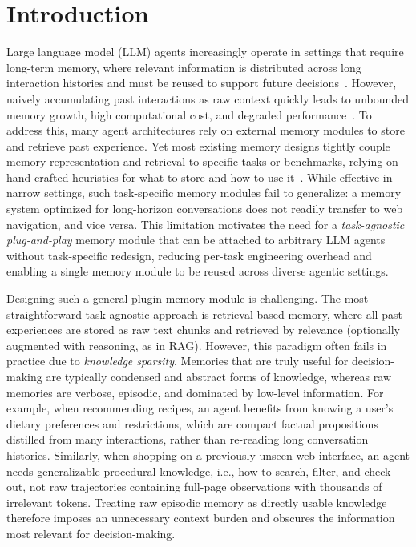 
\section{Introduction}


Large language model (LLM) agents increasingly operate in settings that require long-term memory, where relevant information is distributed across long interaction histories and must be reused to support future decisions~\citep{Wang_2024,park2023generativeagentsinteractivesimulacra}. However, naively accumulating past interactions as raw context quickly leads to unbounded memory growth, high computational cost, and degraded performance~\citep{packer2024memgptllmsoperatingsystems,liu2023lostmiddlelanguagemodels}. To address this, many agent architectures rely on external memory modules to store and retrieve past experience.
Yet most existing memory designs tightly couple memory representation and retrieval to specific tasks or benchmarks, relying on hand-crafted heuristics for what to store and how to use it~\citep{wang2024agentworkflowmemory,gutiérrez2025ragmemorynonparametriccontinual}. While effective in narrow settings, such task-specific memory modules fail to generalize: a memory system optimized for long-horizon conversations does not readily transfer to web navigation, and vice versa. This limitation motivates the need for a \textit{task-agnostic plug-and-play} memory module that can be attached to arbitrary LLM agents without task-specific redesign, reducing per-task engineering overhead and enabling a single memory module to be reused across diverse agentic settings.


Designing such a general plugin memory module is challenging. The most straightforward task-agnostic approach is retrieval-based memory, where all past experiences are stored as raw text chunks and retrieved by relevance (optionally augmented with reasoning, as in RAG). However, this paradigm often fails in practice due to \textit{knowledge sparsity}. Memories that are truly useful for decision-making are typically condensed and abstract forms of knowledge, whereas raw memories are verbose, episodic, and dominated by low-level information. For example, when recommending recipes, an agent benefits from knowing a user’s dietary preferences and restrictions, which are compact factual propositions distilled from many interactions, rather than re-reading long conversation histories. Similarly, when shopping on a previously unseen web interface, an agent needs generalizable procedural knowledge, i.e., how to search, filter, and check out, not raw trajectories containing full-page observations with thousands of irrelevant tokens. Treating raw episodic memory as directly usable knowledge therefore imposes an unnecessary context burden and obscures the information most relevant for decision-making.

